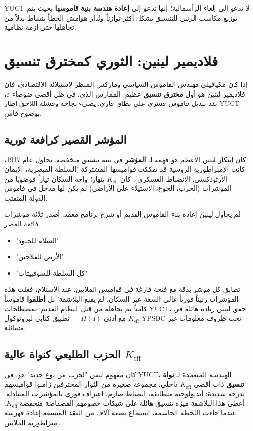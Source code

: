 \documentclass[12pt,a4paper]{article}
\newcommand{\Keff}{K_{\mathrm{eff}}}
\begin{document}
	YUCT لا تدعو إلى إلغاء الرأسمالية؛ إنها تدعو إلى \textbf{إعادة هندسة بنية قاموسها} بحيث يتم توزيع مكاسب الرنين للتنسيق بشكل أكثر توازناً وتُدار هوامش الخطأ بنشاط بدلاً من تجاهلها حتى أزمة نظامية.
	
	\section{فلاديمير لينين: الثوري كمخترق تنسيق}
	\label{sec:lenin}
	
	إذا كان مكيافيلي مهندس القاموس السياسي وماركس المنظر لاستيلائه الاقتصادي، فإن فلاديمير لينين هو أول \textbf{مخترق تنسيق} عظيم: الممارس الذي، في ظل أقصى ضوضاء \(\varepsilon\)، نفذ تبديل قاموس قسري على نطاق قاري. يضيء نجاحه وفشله اللاحق إطار YUCT بوضوح قاسٍ.
	
	\subsection{المؤشر القصير كرافعة ثورية}
	
	كان ابتكار لينين الأعظم هو فهمه لـ \textbf{المؤشر} في بيئة تنسيق منخفضة. بحلول عام 1917، كانت الإمبراطورية الروسية قد تفككت قواميسها المشتركة (السلطة القيصرية، الإيمان الأرثوذكسي، الانضباط العسكري). كان \(\Keff\) ينهار؛ واجه السكان تياراً فوضويًا من المؤشرات (الحرب، الجوع، الاستيلاء على الأراضي) لم يكن لها مدخل في قاموس الدولة المتفتت.
	
	لم يحاول لينين إعادة بناء القاموس القديم أو شرح برنامج معقد. أصدر ثلاثة مؤشرات فائقة القصر:
	\begin{itemize}[leftmargin=*]
		\item "السلام للجنود"
		\item "الأرض للفلاحين"
		\item "كل السلطة للسوفييتات"
	\end{itemize}
	تطابق كل مؤشر بدقة مع فتحة فارغة في قواميس الملايين. عند الاستلام، فعلت هذه المؤشرات رنيناً فورياً عالي السعة عبر السكان. لم يقنع البلاشفة؛ بل \textbf{أطلقوا} قاموساً كامناً تم تجاهله من قبل النظام القديم. بمصطلحات YUCT، حقق لينين زيادة هائلة في \(K_{\mathrm{eff}}\) مع أدنى \(H(I)\) — تطبيق كتابي لبروتوكول YPSDC تحت ظروف معلومات غير متماثلة.
	
	\subsection{الحزب الطليعي كنواة عالية \(K_{\mathrm{eff}}\)}
	
	كان مفهوم لينين "لحزب من نوع جديد" هو، في YUCT، الهندسة المتعمدة لـ \textbf{نواة تنسيق} ذات أقصى \(K_{\mathrm{eff}}\) داخلي. مجموعة صغيرة من الثوار المحترفين زامنوا قواميسهم بدرجة شديدة: أيديولوجية متطابقة، انضباط صارم، اعتراف فوري بالمؤشرات المتبادلة. أعطى هذا البلاشفة ميزة تنسيق هائلة على شبكات خصومهم الفضفاضة منخفضة \(K_{\mathrm{eff}}\). عندما جاءت اللحظة الحاسمة، استطاع بضعة آلاف من العقد المنسقة إعادة فهرسة إمبراطورية الملايين.
	
\end{document}
